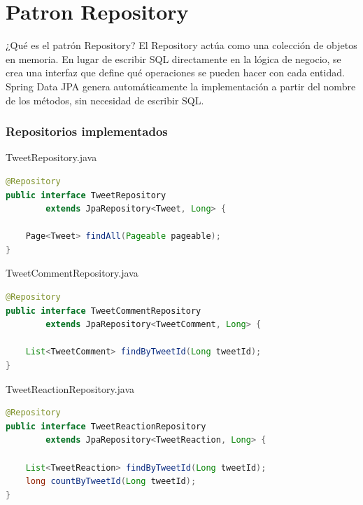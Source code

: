 \documentclass[12pt,a4paper]{article}
\begin{document}
\section{Patron Repository}

\begin{patternbox}{¿Qué es el patrón Repository?}
El Repository actúa como una colección de objetos en memoria. En lugar
de escribir SQL directamente en la lógica de negocio, se crea una
interfaz que define qué operaciones se pueden hacer con cada entidad.
Spring Data JPA genera automáticamente la implementación a partir
del nombre de los métodos, sin necesidad de escribir SQL.
\end{patternbox}

\subsubsection{Repositorios implementados}

\begin{filebox}{TweetRepository.java}
\begin{lstlisting}[language=Java]
@Repository
public interface TweetRepository
        extends JpaRepository<Tweet, Long> {

    Page<Tweet> findAll(Pageable pageable);
}
\end{lstlisting}
\end{filebox}

\begin{filebox}{TweetCommentRepository.java}
\begin{lstlisting}[language=Java]
@Repository
public interface TweetCommentRepository
        extends JpaRepository<TweetComment, Long> {

    List<TweetComment> findByTweetId(Long tweetId);
}
\end{lstlisting}
\end{filebox}

\begin{filebox}{TweetReactionRepository.java}
\begin{lstlisting}[language=Java]
@Repository
public interface TweetReactionRepository
        extends JpaRepository<TweetReaction, Long> {

    List<TweetReaction> findByTweetId(Long tweetId);
    long countByTweetId(Long tweetId);
}
\end{lstlisting}
\end{filebox}
\end{document}
